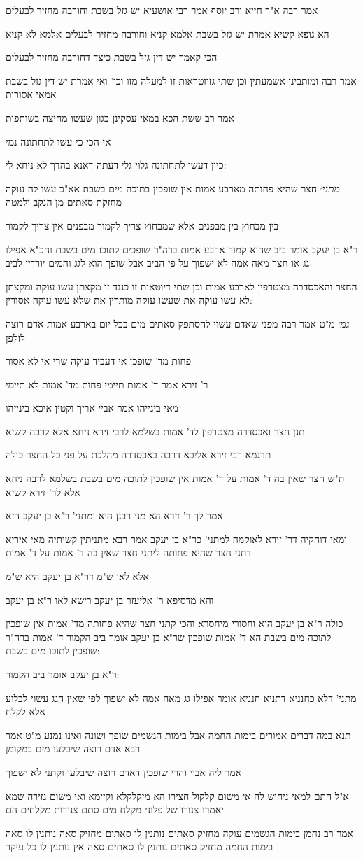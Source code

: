 \documentclass[12pt, openany]{book}
\newcommand{\sethebfont}{
\fontsize{10.5pt}{21.0pt} \selectfont
}
\newcommand{\textblock}[1]{
{\sethebfont #1\\}	
}
\begin{document}
\textblock{אמר רבה א"ר חייא ורב יוסף אמר רבי אושעיא יש גזל בשבת וחורבה מחזיר לבעלים}
\textblock{הא גופא קשיא אמרת יש גזל בשבת אלמא קניא וחורבה מחזיר לבעלים אלמא לא קניא}
\textblock{הכי קאמר יש דין גזל בשבת כיצד דחורבה מחזיר לבעלים}
\textblock{אמר רבה ומותבינן אשמעתין וכן שתי גזוזטראות זו למעלה מזו וכו' ואי אמרת יש דין גזל בשבת אמאי אסורות}
\textblock{אמר רב ששת הכא במאי עסקינן כגון שעשו מחיצה בשותפות}
\textblock{אי הכי כי עשו לתחתונה נמי}
\textblock{כיון דעשו לתחתונה גלוי גלי דעתה דאנא בהדך לא ניחא לי:}
\textblock{{\large\emph{מתני׳}} חצר שהיא פחותה מארבע אמות אין שופכין בתוכה מים בשבת אא"כ עשו לה עוקה מחזקת סאתים מן הנקב ולמטה}
\textblock{בין מבחוץ בין מבפנים אלא שמבחוץ צריך לקמור מבפנים אין צריך לקמור}
\textblock{ר"א בן יעקב אומר ביב שהוא קמור ארבע אמות ברה"ר שופכים לתוכו מים בשבת וחכ"א אפילו גג או חצר מאה אמה לא ישפוך על פי הביב אבל שופך הוא לגג והמים יורדין לביב}
\textblock{החצר והאכסדרה מצטרפין לארבע אמות וכן שתי דיוטאות זו כנגד זו מקצתן עשו עוקה ומקצתן לא עשו עוקה את שעשו עוקה מותרין את שלא עשו עוקה אסורין:}
\textblock{{\large\emph{גמ׳}} מ"ט אמר רבה מפני שאדם עשוי להסתפק סאתים מים בכל יום בארבע אמות אדם רוצה לזלפן}
\textblock{פחות מד' שופכן אי דעביד עוקה שרי אי לא אסור}
\textblock{ר' זירא אמר ד' אמות תיימי פחות מד' אמות לא תיימי}
\textblock{מאי בינייהו אמר אביי אריך וקטין איכא בינייהו}
\textblock{תנן חצר ואכסדרה מצטרפין לד' אמות בשלמא לרבי זירא ניחא אלא לרבה קשיא}
\textblock{תרגמא רבי זירא אליבא דרבה באכסדרה מהלכת על פני כל החצר כולה}
\textblock{ת"ש חצר שאין בה ד' אמות על ד' אמות אין שופכין לתוכה מים בשבת בשלמא לרבה ניחא אלא לר' זירא קשיא}
\textblock{אמר לך ר' זירא הא מני רבנן היא ומתני' ר"א בן יעקב היא}
\textblock{ומאי דוחקיה דר' זירא לאוקמה למתני' כר"א בן יעקב אמר רבא מתניתין קשיתיה מאי איריא דתני חצר שהיא פחותה ליתני חצר שאין בה ד' אמות על ד' אמות}
\textblock{אלא לאו ש"מ דר"א בן יעקב היא ש"מ}
\textblock{והא מדסיפא ר' אליעזר בן יעקב רישא לאו ר"א בן יעקב}
\textblock{כולה ר"א בן יעקב היא וחסורי מיחסרא והכי קתני חצר שהיא פחותה מד' אמות אין שופכין לתוכה מים בשבת הא ד' אמות שופכין שר"א בן יעקב אומר ביב הקמור ד' אמות ברה"ר שופכין לתוכו מים בשבת:}
\textblock{ר"א בן יעקב אומר ביב הקמור:}
\textblock{מתני' דלא כחנניא דתניא חנניא אומר אפילו גג מאה אמה לא ישפוך לפי שאין הגג עשוי לבלוע אלא לקלח}
\textblock{תנא במה דברים אמורים בימות החמה אבל בימות הגשמים שופך ושונה ואינו נמנע מ"ט אמר רבא אדם רוצה שיבלעו מים במקומן}
\textblock{אמר ליה אביי והרי שופכין דאדם רוצה שיבלעו וקתני לא ישפוך}
\textblock{א"ל התם למאי ניחוש לה אי משום קלקול חצירו הא מיקלקלא וקיימא ואי משום גזירה שמא יאמרו צנורו של פלוני מקלח מים סתם צנורות מקלחים הם}
\textblock{אמר רב נחמן בימות הגשמים עוקה מחזיק סאתים נותנין לו סאתים מחזיק סאה נותנין לו סאה בימות החמה מחזיק סאתים נותנין לו סאתים סאה אין נותנין לו כל עיקר}
\end{document}
